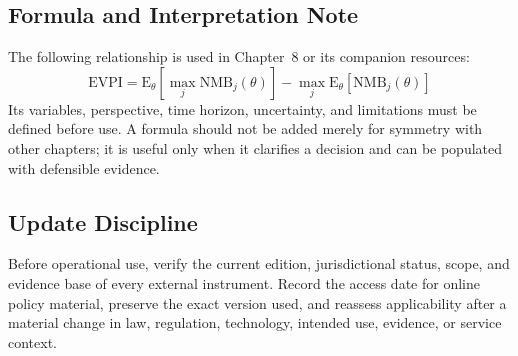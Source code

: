 \subsection{Formula and Interpretation Note}
The following relationship is used in Chapter~8 or its companion resources:
\begin{equation}
\mathrm{EVPI}=\mathrm{E}_{\theta}[\max_j \mathrm{NMB}_j(\theta)]-\max_j\mathrm{E}_{\theta}[\mathrm{NMB}_j(\theta)]
\label{eq:comp-ch08-reference-formula}
\end{equation}
Its variables, perspective, time horizon, uncertainty, and limitations must be
defined before use. A formula should not be added merely for symmetry with other
chapters; it is useful only when it clarifies a decision and can be populated with
defensible evidence.

\subsection{Update Discipline}
Before operational use, verify the current edition, jurisdictional status, scope,
and evidence base of every external instrument. Record the access date for online
policy material, preserve the exact version used, and reassess applicability after a
material change in law, regulation, technology, intended use, evidence, or service
context.
